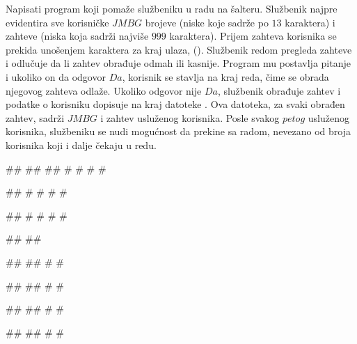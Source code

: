 \begin{Exercise}[label=4_10]
Napisati program koji pomaže službeniku u radu na šalteru.
Službenik najpre evidentira sve korisničke $JMBG$ brojeve (niske koje sadrže po $13$ karaktera) i zahteve (niska koja sadrži najviše $999$ karaktera). 
Prijem zahteva korisnika se prekida unošenjem karaktera za kraj ulaza, ().
Službenik redom pregleda zahteve i odlučuje da li zahtev obrađuje odmah ili kasnije. Program mu postavlja pitanje 
 i ukoliko on da odgovor $Da$, 
korisnik se stavlja na kraj reda, čime se obrada njegovog zahteva odlaže. Ukoliko odgovor nije $Da$, službenik obrađuje zahtev i podatke o korisniku dopisuje na kraj datoteke . Ova datoteka, za svaki obrađen zahtev, sadrži $JMBG$ i zahtev usluženog korisnika.
Posle svakog $petog$ usluženog korisnika, službeniku se nudi mogućnost da prekine sa radom, nevezano od broja korisnika koji i dalje čekaju u redu. 

\begin{maxitest}
\begin{upotreba}{1}
#\naslovInt#
## 
##
# #
# #

##
# #
# #

##
# #
# #

##
##

##
##
# #

##
##
# #

##
##
# #

##
##
# #


\end{upotreba}
\end{maxitest}
\end{Exercise}
